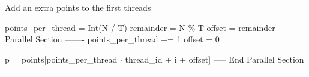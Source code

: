 \documentclass{report}
\begin{document}
\begin{minipage}[b]{0.48\textwidth}
  \begin{algorithm}[H]
    \caption{Add an extra points to the first threads}
    \begin{algorithmic}
      \State points\_per\_thread = Int(N / T)
      \State remainder = N \% T
      \State offset = remainder
      \State ------- Parallel Section -------
        \State points\_per\_thread += 1
        \State offset = 0
      \EndIf

        \State p = points[points\_per\_thread $\cdot$ thread\_id + i + offset]
      \EndFor
      \State ----- End Parallel Section -----
    \end{algorithmic}
  \end{algorithm}

\end{minipage}
\hspace{0.1in}
\begin{minipage}[b]{0.48\textwidth}
  
\end{minipage}
\end{document}
